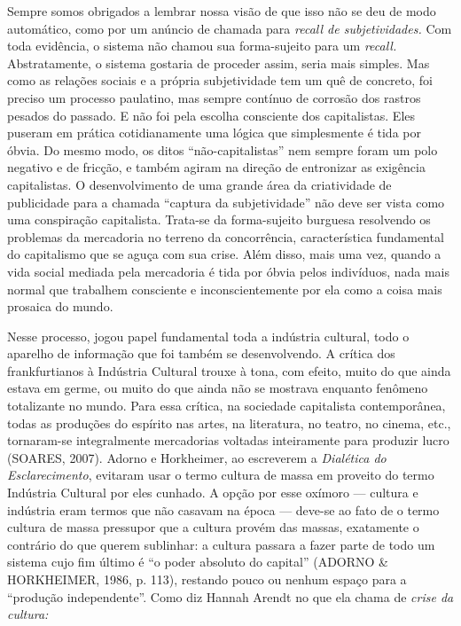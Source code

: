Sempre somos obrigados a lembrar nossa visão de que isso não se deu de
modo automático, como por um anúncio de chamada para \emph{recall de
subjetividades.} Com toda evidência, o sistema não chamou sua
forma-sujeito para um \emph{recall.} Abstratamente, o sistema gostaria
de proceder assim, seria mais simples. Mas como as relações sociais e a
própria subjetividade tem um quê de concreto, foi preciso um processo
paulatino, mas sempre contínuo de corrosão dos rastros pesados do
passado. E não foi pela escolha consciente dos capitalistas. Eles
puseram em prática cotidianamente uma lógica que simplesmente é tida por
óbvia. Do mesmo modo, os ditos ``não-capitalistas'' nem sempre foram um
polo negativo e de fricção, e também agiram na direção de entronizar as
exigência capitalistas. O desenvolvimento de uma grande área da
criatividade de publicidade para a chamada ``captura da subjetividade''
não deve ser vista como uma conspiração capitalista. Trata-se da
forma-sujeito burguesa resolvendo os problemas da mercadoria no terreno
da concorrência, característica fundamental do capitalismo que se aguça
com sua crise. Além disso, mais uma vez, quando a vida social mediada
pela mercadoria é tida por óbvia pelos indivíduos, nada mais normal que
trabalhem consciente e inconscientemente por ela como a coisa mais
prosaica do mundo.

Nesse processo, jogou papel fundamental toda a indústria cultural, todo
o aparelho de informação que foi também se desenvolvendo. A crítica dos
frankfurtianos à Indústria Cultural trouxe à tona, com efeito, muito do
que ainda estava em germe, ou muito do que ainda não se mostrava
enquanto fenômeno totalizante no mundo. Para essa crítica, na sociedade
capitalista contemporânea, todas as produções do espírito nas artes, na
literatura, no teatro, no cinema, etc., tornaram-se integralmente
mercadorias voltadas inteiramente para produzir lucro (SOARES, 2007).
Adorno e Horkheimer, ao escreverem a \emph{Dialética do Esclarecimento},
evitaram usar o termo cultura de massa em proveito do termo Indústria
Cultural por eles cunhado. A opção por esse oxímoro --- cultura e
indústria eram termos que não casavam na época --- deve-se ao fato de o
termo cultura de massa pressupor que a cultura provém das massas,
exatamente o contrário do que querem sublinhar: a cultura passara a
fazer parte de todo um sistema cujo fim último é ``o poder absoluto do
capital'' (ADORNO \& HORKHEIMER, 1986, p. 113), restando pouco ou nenhum
espaço para a ``produção independente''. Como diz Hannah Arendt no que
ela chama de \emph{crise da cultura:}

